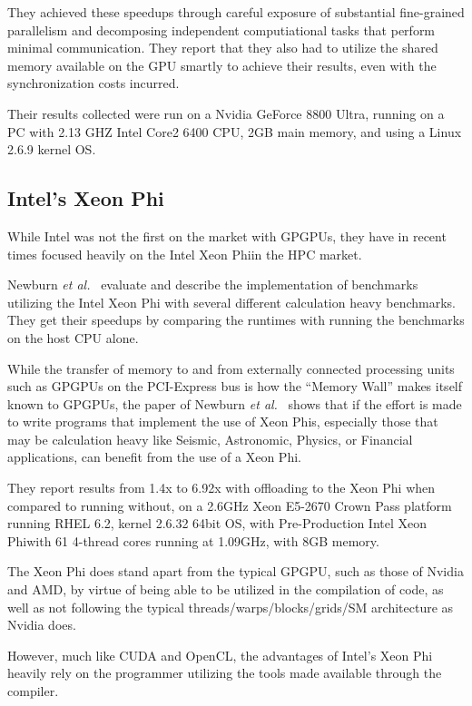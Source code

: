 They achieved these speedups through careful exposure of substantial fine-grained parallelism and decomposing independent computiational tasks that perform minimal communication.
They report that they also had to utilize the shared memory available on the GPU smartly to achieve their results, even with the synchronization costs incurred.

Their results collected were run on a Nvidia GeForce 8800 Ultra, running on a PC with 2.13 GHZ Intel Core2 6400 CPU, 2GB main memory, and using a Linux 2.6.9 kernel OS.

\subsection{Intel's Xeon Phi}

While Intel was not the first on the market with GPGPUs, they have in recent times focused heavily on the Intel Xeon Phi\texttrademark in the HPC market.

Newburn \textit{et al.}~\cite{Newburn:2013:OCR:2510648.2511038} evaluate and describe the implementation of benchmarks utilizing the Intel Xeon Phi with several different calculation heavy benchmarks.
They get their speedups by comparing the runtimes with running the benchmarks on the host CPU alone.

While the transfer of memory to and from externally connected processing units such as GPGPUs on the PCI-Express bus is how the ``Memory Wall'' makes itself known to GPGPUs,
the paper of Newburn \textit{et al.}~\cite{Newburn:2013:OCR:2510648.2511038} shows that if the effort is made to write programs that implement the use of Xeon Phis, especially those that may be calculation heavy like Seismic, Astronomic, Physics, or Financial applications, can benefit from the use of a Xeon Phi.

They report results from 1.4x to 6.92x with offloading to the Xeon Phi when compared to running without, on a 2.6GHz Xeon E5-2670 Crown Pass platform running RHEL 6.2, kernel 2.6.32 64bit OS, with Pre-Production Intel Xeon Phi\texttrademark with 61 4-thread cores running at 1.09GHz, with 8GB memory.

The Xeon Phi does stand apart from the typical GPGPU, such as those of Nvidia and AMD, by virtue of being able to be utilized in the compilation of code, as well as not following the typical threads/warps/blocks/grids/SM architecture as Nvidia does.

However, much like CUDA and OpenCL, the advantages of Intel's Xeon Phi heavily rely on the programmer utilizing the tools made available through the compiler.
